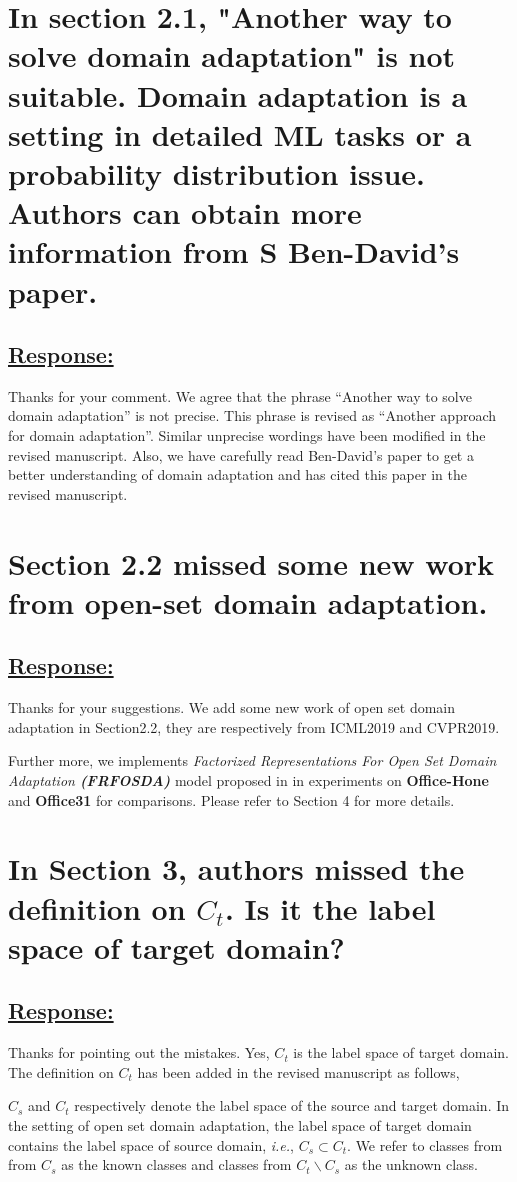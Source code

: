 \section{In section 2.1, "Another way to solve domain adaptation" is not suitable. 
Domain adaptation is a setting in detailed ML tasks or a probability distribution issue. 
Authors can obtain more information from S Ben-David's paper.}
\subsection*{\underline{\textbf{Response:}}}
Thanks for your comment.
We agree that the phrase ``Another way to solve domain adaptation'' is not precise. 
This phrase is revised as ``Another approach for domain adaptation''. 
Similar unprecise wordings have been modified in the revised manuscript.
Also, we have carefully read Ben-David's paper \cite{ben2010theory} to get a better understanding of domain adaptation and has cited this paper in the revised manuscript.


\section{Section 2.2 missed some new work from open-set domain adaptation.}
\subsection*{\underline{\textbf{Response:}}}
Thanks for your suggestions.
We add some new work \cite{PDA-fac,PDA-sep} of open set domain adaptation in Section2.2, they are respectively from ICML2019 and CVPR2019.

Further more, we implements \textit{Factorized Representations For Open Set Domain Adaptation \textbf{(FRFOSDA)}} model proposed in \cite{PDA-fac} in experiments on \textbf{Office-Hone} and \textbf{Office31} for comparisons.
Please refer to Section 4 for more details.

\section{In Section 3, authors missed the definition on $C_t$. Is it the label space of target domain?}
\subsection*{\underline{\textbf{Response:}}}
Thanks for pointing out the mistakes.
Yes, $C_t$ is the label space of target domain.
The definition on $C_t$ has been added in the revised manuscript as follows,
\begin{siderules}
$C_s$ and $C_t$ respectively denote the label space of the source and target domain.
In the setting of open set domain adaptation, the label space of target domain contains the label space of source domain, \textit{i.e.}, $C_s \subset C_t$. 
We refer to classes from from $C_s$ as the known classes and classes from $C_t\backslash C_s$ as the unknown class.
\end{siderules}


